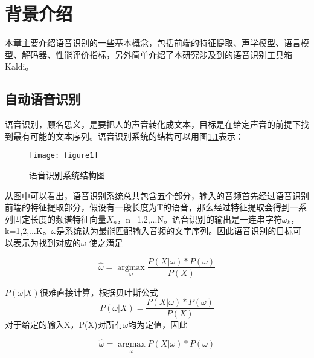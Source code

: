 
\chapter{背景介绍}
本章主要介绍语音识别的一些基本概念，包括前端的特征提取、声学模型、语言模型、解码器、性能评价指标，另外简单介绍了本研究涉及到的语音识别工具箱——Kaldi\cite{povey2011kaldi}。
\section{自动语音识别}
语音识别，顾名思义，是要把人的声音转化成文本，目标是在给定声音的前提下找到最有可能的文本序列。语音识别系统的结构可以用图\ref{fig:figure1}表示：
\begin{figure}[htbp]
\centering
\texttt{[image: figure1]}
\caption{语音识别系统结构图}\label{fig:figure1}
\vspace{\baselineskip}
\end{figure}
从图中可以看出，语音识别系统总共包含五个部分，输入的音频首先经过语音识别前端的特征提取部分，假设有一段长度为T的语音，那么经过特征提取会得到一系列固定长度的频谱特征向量$X_{n}$，n=1,2,...N。语音识别的输出是一连串字符$\omega_{k}$，k=1,2,...K。$\omega$是系统认为最能匹配输入音频的文字序列。因此语音识别的目标可以表示为找到对应的$\omega$ 使之满足

\begin{equation}
\widehat{\omega} = \underset{\omega} {\operatorname{argmax}} {\frac{P(X|\omega)*P(\omega)}{P(X)}}
\end{equation}

$P(\omega|X)$很难直接计算，根据贝叶斯公式
\begin{equation}P(\omega|X)=\frac{P(X|\omega)*P(\omega)}{P(X)}\end{equation}
对于给定的输入X，P(X)对所有$\omega$均为定值，因此

\begin{equation}
\widehat{\omega} = \underset{\omega} {\operatorname{argmax}} {P(X|\omega)*P(\omega)}
\end{equation}\label{ASR cost function}

